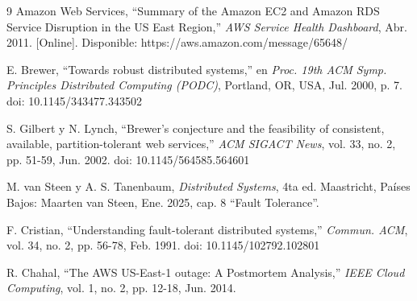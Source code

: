 \documentclass[12pt,a4paper]{article}
\begin{document}
\begin{thebibliography}{9}
Amazon Web Services, ``Summary of the Amazon EC2 and Amazon RDS Service Disruption in the US East Region,'' \textit{AWS Service Health Dashboard}, Abr. 2011. [Online]. Disponible: https://aws.amazon.com/message/65648/

E. Brewer, ``Towards robust distributed systems,'' en \textit{Proc. 19th ACM Symp. Principles Distributed Computing (PODC)}, Portland, OR, USA, Jul. 2000, p. 7. doi: 10.1145/343477.343502

S. Gilbert y N. Lynch, ``Brewer's conjecture and the feasibility of consistent, available, partition-tolerant web services,'' \textit{ACM SIGACT News}, vol. 33, no. 2, pp. 51-59, Jun. 2002. doi: 10.1145/564585.564601

M. van Steen y A. S. Tanenbaum, \textit{Distributed Systems}, 4ta ed. Maastricht, Países Bajos: Maarten van Steen, Ene. 2025, cap. 8 ``Fault Tolerance''.

F. Cristian, ``Understanding fault-tolerant distributed systems,'' \textit{Commun. ACM}, vol. 34, no. 2, pp. 56-78, Feb. 1991. doi: 10.1145/102792.102801

R. Chahal, ``The AWS US-East-1 outage: A Postmortem Analysis,'' \textit{IEEE Cloud Computing}, vol. 1, no. 2, pp. 12-18, Jun. 2014.
\end{thebibliography}
\end{document}

